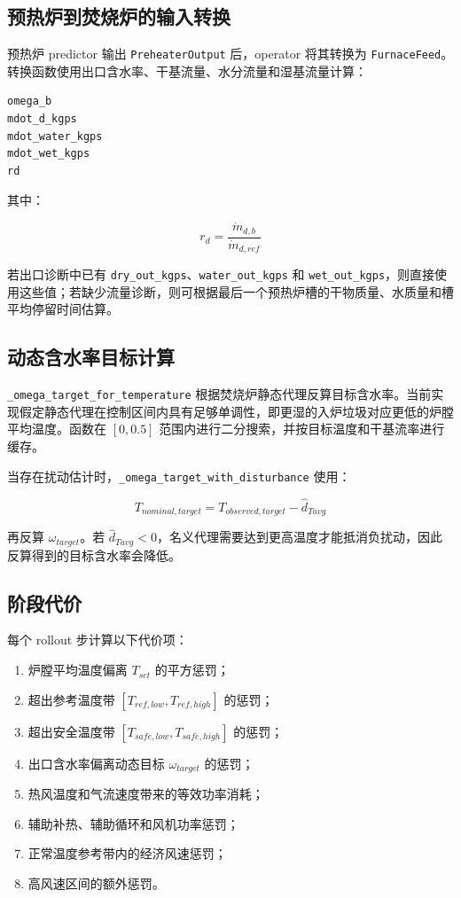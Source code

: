 \documentclass[UTF8,openany,zihao=-4,oneside]{ctexbook}
\providecommand{\tightlist}{\setlength{\itemsep}{0pt}\setlength{\parskip}{0pt}}
\providecommand{\passthrough}[1]{#1}
\begin{document}
\subsection{预热炉到焚烧炉的输入转换}\label{subsec:preheater-to-furnace-feed-impl}

预热炉 predictor 输出 \passthrough{\lstinline!PreheaterOutput!} 后，operator 将其转换为 \passthrough{\lstinline!FurnaceFeed!}。转换函数使用出口含水率、干基流量、水分流量和湿基流量计算：

\begin{lstlisting}
omega_b
mdot_d_kgps
mdot_water_kgps
mdot_wet_kgps
rd
\end{lstlisting}

其中：

\[
r_d=\frac{\dot m_{d,b}}{\dot m_{d,ref}}
\]

若出口诊断中已有 \passthrough{\lstinline!dry_out_kgps!}、\passthrough{\lstinline!water_out_kgps!} 和 \passthrough{\lstinline!wet_out_kgps!}，则直接使用这些值；若缺少流量诊断，则可根据最后一个预热炉槽的干物质量、水质量和槽平均停留时间估算。

\subsection{动态含水率目标计算}\label{subsec:omega-target-code}

\passthrough{\lstinline!_omega_target_for_temperature!} 根据焚烧炉静态代理反算目标含水率。当前实现假定静态代理在控制区间内具有足够单调性，即更湿的入炉垃圾对应更低的炉膛平均温度。函数在 \([0,0.5]\) 范围内进行二分搜索，并按目标温度和干基流率进行缓存。

当存在扰动估计时，\passthrough{\lstinline!_omega_target_with_disturbance!} 使用：

\[
T_{nominal,target}=T_{observed,target}-\hat d_{Tavg}
\]

再反算 \(\omega_{target}\)。若 \(\hat d_{Tavg}<0\)，名义代理需要达到更高温度才能抵消负扰动，因此反算得到的目标含水率会降低。

\subsection{阶段代价}\label{subsec:stage-cost-impl}

每个 rollout 步计算以下代价项：

\begin{enumerate}
\def\labelenumi{\arabic{enumi}.}
\tightlist
\item
  炉膛平均温度偏离 \(T_{set}\) 的平方惩罚；
\item
  超出参考温度带 \([T_{ref,low},T_{ref,high}]\) 的惩罚；
\item
  超出安全温度带 \([T_{safe,low},T_{safe,high}]\) 的惩罚；
\item
  出口含水率偏离动态目标 \(\omega_{target}\) 的惩罚；
\item
  热风温度和气流速度带来的等效功率消耗；
\item
  辅助补热、辅助循环和风机功率惩罚；
\item
  正常温度参考带内的经济风速惩罚；
\item
  高风速区间的额外惩罚。
\end{enumerate}
\end{document}
